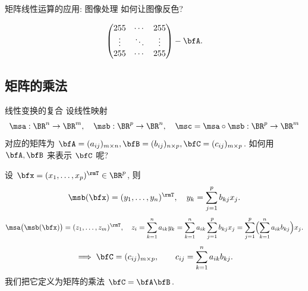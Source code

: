 \begin{frame}{矩阵线性运算的应用: 图像处理\noexer}
	\onslide<+->
	如何让图像反色?
	\begin{center}
	\end{center}

	\onslide<+->
	\[\begin{pmatrix}
		255&\cdots&255\\
		\vdots&\ddots&\vdots\\
		255&\cdots&255
	\end{pmatrix}-\bfA.\]
\end{frame}

\subsection{矩阵的乘法}


\begin{frame}{线性变换的复合}
	\onslide<+->
	设线性映射
	\[\msa:\BR^n\to\BR^m,\quad
	\msb:\BR^p\to \BR^n,\quad 
	\msc=\msa\circ \msb:\BR^p\to\BR^m\]
	对应的矩阵为 $\bfA=(a_{ij})_{m\times n}, \bfB=(b_{ij})_{n\times p},\bfC=(c_{ij})_{m\times p}$.
	\onslide<+->
	如何用 $\bfA,\bfB$ 来表示 $\bfC$ 呢?

	\onslide<+->
	设 $\bfx=(x_1,\dots,x_p)^\rmT\in \BR^p$, 则
	\[\msb(\bfx)=(y_1,\dots,y_n)^\rmT, \quad
		y_k=\sum_{j=1}^p b_{kj} x_j.\]
	\onslide<+->
	\[\msa\bigl(\msb(\bfx)\bigr)=(z_1,\dots,z_m)^\rmT, \quad
	z_i=\sum_{k=1}^n a_{ik} y_k=\sum_{k=1}^n a_{ik} \sum_{j=1}^p b_{kj} x_j=\sum_{j=1}^p\Bigl(\sum_{k=1}^n a_{ik}b_{kj}\Bigr)x_j.\]
	\onslide<+->
	\[\implies\bfC=(c_{ij})_{m\times p},\qquad c_{ij}=\sum_{k=1}^n a_{ik}b_{kj}.\]
	\onslide<+->
	我们把它定义为矩阵的乘法 $\bfC=\bfA\bfB$.
\end{frame}


